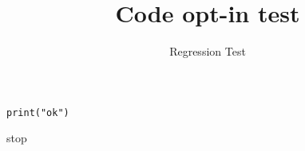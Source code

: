 \documentclass{e_class_article}
\title{Code opt-in test}
\author{Regression Test}
\begin{document}
\texttt{print("ok")}
\begin{algorithm}
\caption{A smoke-test algorithm}
stop\;
\end{algorithm}
\end{document}
